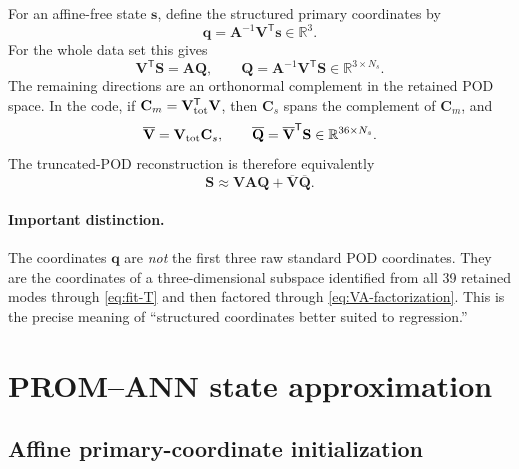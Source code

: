 \documentclass[11pt,a4paper]{article}
\newcommand{\R}{\mathbb{R}}
\newcommand{\transpose}{^{\mathsf T}}
\newcommand{\vect}[1]{\mathbf{#1}}
\newcommand{\mat}[1]{\mathbf{#1}}
\begin{document}
For an affine-free state \(\vect s\), define the structured primary
coordinates by
\begin{equation}
  \vect q
  = \mat A^{-1}\mat V\transpose\vect s\in\R^3.
  \label{eq:structured-q}
\end{equation}
For the whole data set this gives
\begin{equation}
  \mat V\transpose\mat S=\mat A\mat Q,
  \qquad
  \mat Q=\mat A^{-1}\mat V\transpose\mat S
  \in\R^{3\times N_s}.
  \label{eq:structured-Q}
\end{equation}
The remaining directions are an orthonormal complement in the retained POD
space.  In the code, if \(\mat C_m=\mat V_{\rm tot}\transpose\mat V\), then
\(\mat C_s\) spans the complement of \(\mat C_m\), and
\begin{equation}
  \overline{\mat V}=\mat V_{\rm tot}\mat C_s,
  \qquad
  \overline{\mat Q}=\overline{\mat V}\transpose\mat S
  \in\R^{36\times N_s}.
  \label{eq:secondary-coordinates}
\end{equation}
The truncated-POD reconstruction is therefore equivalently
\begin{equation}
  \mat S
  \approx
  \mat V\mat A\mat Q
  +\overline{\mat V}\overline{\mat Q}.
  \label{eq:split-reconstruction}
\end{equation}

\paragraph{Important distinction.}
The coordinates \(\vect q\) are \emph{not} the first three raw standard POD
coordinates.  They are the coordinates of a three-dimensional subspace
identified from all 39 retained modes through \cref{eq:fit-T} and then
factored through \cref{eq:VA-factorization}.  This is the precise meaning of
``structured coordinates better suited to regression.''

\section{PROM--ANN state approximation}
\label{sec:prom-ann}

\subsection{Affine primary-coordinate initialization}
\end{document}
